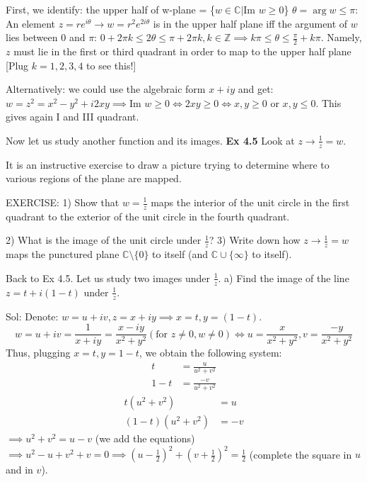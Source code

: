 \documentclass{article}
\begin{document}
First, we identify: the upper half of w-plane = \{$w \in \mathbb{C} \vert  \text{Im } w \geq 0$\} $\theta = \arg w \leq \pi$: An element $z = re^{i\theta} \to w = r^2 e^{2i\theta}$ is in the upper half plane iff the argument of $w$ lies between 0 and $\pi$: $0 + 2\pi k \leq 2\theta \leq \pi + 2\pi k, k \in \mathbb{Z} \implies k\pi \leq \theta \leq \frac{\pi}{2} + k\pi$. Namely, $z$ must lie in the first or third quadrant in order to map to the upper half plane [Plug $k = 1, 2, 3, 4$ to see this!]

Alternatively: we could use the algebraic form $x + iy$ and get: $w = z^2 = x^2 - y^2 + i2xy \implies \text{Im } w \geq 0 \iff 2xy \geq 0 \iff x, y \geq 0$ or $x, y \leq 0$. This gives again I and III quadrant.

Now let us study another function and its images.
\textbf{Ex 4.5} Look at $z \to \frac{1}{z} = w$.

It is an instructive exercise to draw a picture trying to determine where to various regions of the plane are mapped.

EXERCISE: 1) Show that $w = \frac{1}{z}$ maps the interior of the unit circle in the first quadrant to the exterior of the unit circle in the fourth quadrant.

2) What is the image of the unit circle under $\frac{1}{z}$?
3) Write down how $z \to \frac{1}{z} = w$ maps the punctured plane $\mathbb{C} \setminus \{0\}$ to itself (and $\mathbb{C} \cup \{\infty\}$ to itself).

Back to Ex 4.5. Let us study two images under $\frac{1}{z}$.
a) Find the image of the line $z = t + i(1 - t)$ under $\frac{1}{z}$.

Sol: Denote: $w = u + iv, z = x + iy \implies x = t, y = (1 - t)$.
$$w = u + iv = \frac{1}{x + iy} = \frac{x - iy}{x^2 + y^2} (\text{for } z \neq 0, w \neq 0) \iff u = \frac{x}{x^2 + y^2}, v = \frac{-y}{x^2 + y^2}$$
Thus, plugging $x = t, y = 1 - t$, we obtain the following system:
\begin{align*}
t &= \frac{u}{u^2 + v^2} \\
1 - t &= \frac{-v}{u^2 + v^2}
\end{align*}
\begin{align*}
t(u^2 + v^2) &= u \\
(1 - t)(u^2 + v^2) &= -v
\end{align*}
$\implies u^2 + v^2 = u - v$ (we add the equations) $\implies u^2 - u + v^2 + v = 0 \implies (u - \frac{1}{2})^2 + (v + \frac{1}{2})^2 = \frac{1}{2}$ (complete the square in $u$ and in $v$).
\end{document}
